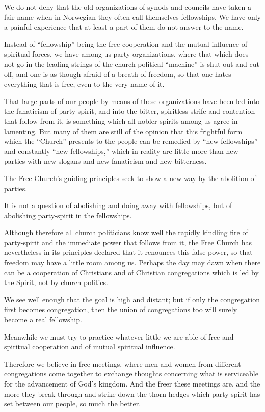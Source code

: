 We do not deny that the old organizations of synods and councils have taken a fair name when in Norwegian they often call themselves fellowships. We have only a painful experience that at least a part of them do not answer to the name.

Instead of “fellowship” being the free cooperation and the mutual influence of spiritual forces, we have among us party organizations, where that which does not go in the leading-strings of the church-political “machine” is shut out and cut off, and one is as though afraid of a breath of freedom, so that one hates everything that is free, even to the very name of it.

That large parts of our people by means of these organizations have been led into the fanaticism of party-spirit, and into the bitter, spiritless strife and contention that follow from it, is something which all nobler spirits among us agree in lamenting. But many of them are still of the opinion that this frightful form which the “Church” presents to the people can be remedied by “new fellowships” and constantly “new fellowships,” which in reality are little more than new parties with new slogans and new fanaticism and new bitterness.

The Free Church’s guiding principles seek to show a new way by the abolition of parties.

It is not a question of abolishing and doing away with fellowships, but of abolishing party-spirit in the fellowships.

Although therefore all church politicians know well the rapidly kindling fire of party-spirit and the immediate power that follows from it, the Free Church has nevertheless in its principles declared that it renounces this false power, so that freedom may have a little room among us. Perhaps the day may dawn when there can be a cooperation of Christians and of Christian congregations which is led by the Spirit, not by church politics.

We see well enough that the goal is high and distant; but if only the congregation first becomes congregation, then the union of congregations too will surely become a real fellowship.

Meanwhile we must try to practice whatever little we are able of free and spiritual cooperation and of mutual spiritual influence.

Therefore we believe in free meetings, where men and women from different congregations come together to exchange thoughts concerning what is serviceable for the advancement of God’s kingdom. And the freer these meetings are, and the more they break through and strike down the thorn-hedges which party-spirit has set between our people, so much the better.

